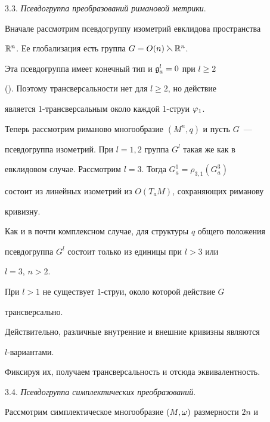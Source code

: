 3.3. {\it Псевдогруппа преобразований римановой метрики}.


Вначале рассмотрим псевдогруппу изометрий евклидова пространства


${\Bbb R}^n$. Ее глобализация есть группа $G=O(n)\leftthreetimes{\Bbb R}^n$.


Эта псевдогруппа имеет конечный тип и ${\frak g}^l_a=0$ при $l\ge2$


(\cite{Ko}). Поэтому трансверсальности нет для $l\ge2$, но действие


является 1-трансверсальным около каждой 1-струи $\varphi_1$.





Теперь рассмотрим риманово многообразие $(M^n,q)$ и пусть $G$~---


псевдогруппа изометрий. При $l=1,2$ группа $G^l$ такая же как в


евклидовом случае. Рассмотрим $l=3$. Тогда $G^1_a=\rho_{3,1}(G^3_a)$


состоит из линейных изометрий из $O(T_aM)$, сохраняющих риманову


кривизну.





Как и в почти комплексном случае, для структуры $q$ общего положения


псевдогруппа $G^l$ состоит только из единицы при $l>3$ или


$l=3$, $n>2$.





\begin{prop}


При $l>1$ не существует $1$-струи, около которой действие $G$


трансверсально.


\end{prop}





Действительно, различные внутренние и внешние кривизны являются


$l$-вариантами.


Фиксируя их, получаем трансверсальность и отсюда эквивалентность.


\medskip





3.4. {\it Псевдогруппа симплектических преобразований}.


Рассмотрим симплектическое многообразие $(M,\omega)$ размерности $2n$ и


